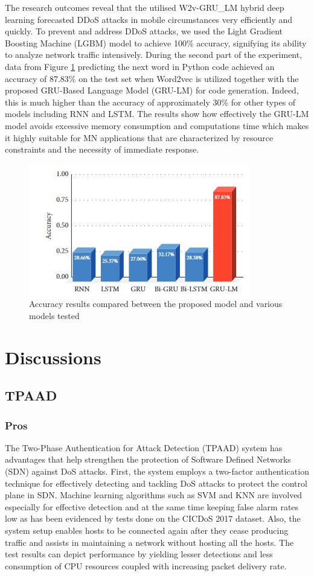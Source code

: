 \documentclass[a4paper, 12pt]{article}
\begin{document}
The research outcomes reveal that the utilised W2v-GRU\_LM hybrid deep learning forecasted DDoS attacks in mobile circumstances very efficiently and quickly. To prevent and address DDoS attacks, we used the Light Gradient Boosting Machine (LGBM) model to achieve 100\% accuracy, signifying its ability to analyze network traffic intensively. During the second part of the experiment, data from Figure \ref{fig:grulm} predicting the next word in Python code achieved an accuracy of 87.83\% on the test set when Word2vec is utilized together with the proposed GRU-Based Language Model (GRU-LM) for code generation. Indeed, this is much higher than the accuracy of approximately 30\% for other types of models including RNN and LSTM. The results show how effectively the GRU-LM model avoids excessive memory consumption and computations time which makes it highly suitable for MN applications that are characterized by resource constraints and the necessity of immediate response. 

\begin{figure}[H]
    \centering
    \includegraphics[width=0.7\linewidth]{image-grulm.png}
    \caption{Accuracy results compared between the proposed model and various models tested \protect{}}
    \label{fig:grulm}
\end{figure}

\clearpage

\section{Discussions}
\subsection{TPAAD}
\subsubsection{Pros}
The Two-Phase Authentication for Attack Detection (TPAAD) system has advantages that help strengthen the protection of Software Defined Networks (SDN) against DoS attacks. First, the system employs a two-factor authentication technique for effectively detecting and tackling DoS attacks to protect the control plane in SDN. Machine learning algorithms such as SVM and KNN are involved especially for effective detection and at the same time keeping false alarm rates low as has been evidenced by tests done on the CICDoS 2017 dataset. Also, the system setup enables hosts to be connected again after they cease producing traffic and assists in maintaining a network without hosting all the hosts. The test results can depict performance by yielding lesser detections and less consumption of CPU resources coupled with increasing packet delivery rate. 
\end{document}
